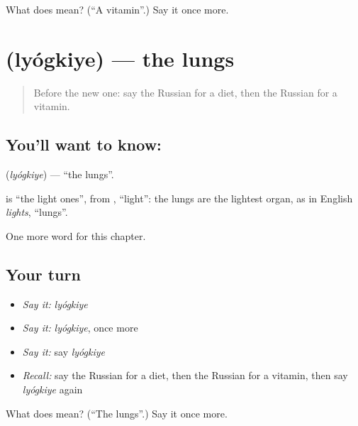 \begin{tcolorbox}[breakable,colback=teal!4,colframe=teal!35!black,title={Before you move on}]
What does  mean? (\textquotedblleft{}A vitamin\textquotedblright{}.) Say it once more.
\end{tcolorbox}
\section[\texorpdfstring{\ru{лёгкие} (lyógkiye)}{лёгкие (lyógkiye)}]{ (lyógkiye) — the lungs}

\label{lesson:RU-C180-lyogkiye}



\begin{quote}
Before the new one: say the Russian for a diet, then the Russian for a vitamin.
\end{quote}

\subsection*{You'll want to know: }
\textbf{} (\emph{lyógkiye}) — \textquotedblleft{}the lungs\textquotedblright{}.

\begin{cousinweb}
\textbf{} is \textquotedblleft{}the light ones\textquotedblright{}, from \emph{}, \textquotedblleft{}light\textquotedblright{}: the lungs are the lightest organ, as in English \emph{lights}, \textquotedblleft{}lungs\textquotedblright{}.
\end{cousinweb}

\begin{grammarlens}[title={What you've built}]
One more word for this chapter.
\end{grammarlens}

\subsection*{Your turn}
\begin{itemize}
\raggedright
  \item \emph{Say it:} \emph{lyógkiye}
  \item \emph{Say it:} \emph{lyógkiye}, once more
  \item \emph{Say it:} say \emph{lyógkiye}
  \item \emph{Recall:} say the Russian for a diet, then the Russian for a vitamin, then say \emph{lyógkiye} again
\end{itemize}

\begin{tcolorbox}[breakable,colback=teal!4,colframe=teal!35!black,title={Before you move on}]
What does  mean? (\textquotedblleft{}The lungs\textquotedblright{}.) Say it once more.
\end{tcolorbox}
